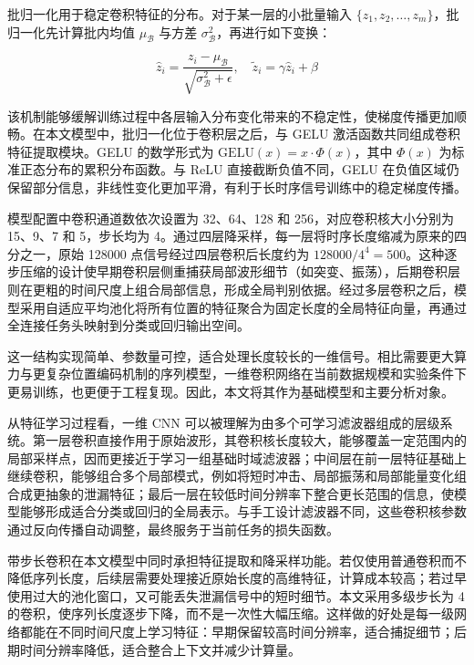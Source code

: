 批归一化用于稳定卷积特征的分布。对于某一层的小批量输入 $\{z_1, z_2, \ldots, z_m\}$，批归一化先计算批内均值 $\mu_{\mathcal{B}}$ 与方差 $\sigma^2_{\mathcal{B}}$，再进行如下变换：

\begin{equation}
\hat{z}_i = \frac{z_i - \mu_{\mathcal{B}}}{\sqrt{\sigma^2_{\mathcal{B}} + \epsilon}}, \quad
\tilde{z}_i = \gamma \hat{z}_i + \beta
\end{equation}

该机制能够缓解训练过程中各层输入分布变化带来的不稳定性，使梯度传播更加顺畅\cite{ioffe2015batch}。在本文模型中，批归一化位于卷积层之后，与 GELU 激活函数共同组成卷积特征提取模块。GELU 的数学形式为 $\text{GELU}(x) = x \cdot \Phi(x)$，其中 $\Phi(x)$ 为标准正态分布的累积分布函数。与 ReLU 直接截断负值不同，GELU 在负值区域仍保留部分信息，非线性变化更加平滑，有利于长时序信号训练中的稳定梯度传播\cite{hendrycks2016gelu}。

模型配置中卷积通道数依次设置为 32、64、128 和 256，对应卷积核大小分别为 15、9、7 和 5，步长均为 4。通过四层降采样，每一层将时序长度缩减为原来的四分之一，原始 128000 点信号经过四层卷积后长度约为 $128000 / 4^4 = 500$。这种逐步压缩的设计使早期卷积层侧重捕获局部波形细节（如突变、振荡），后期卷积层则在更粗的时间尺度上组合局部信息，形成全局判别依据。经过多层卷积之后，模型采用自适应平均池化将所有位置的特征聚合为固定长度的全局特征向量，再通过全连接任务头映射到分类或回归输出空间。

这一结构实现简单、参数量可控，适合处理长度较长的一维信号。相比需要更大算力与更复杂位置编码机制的序列模型，一维卷积网络在当前数据规模和实验条件下更易训练，也更便于工程复现。因此，本文将其作为基础模型和主要分析对象。

从特征学习过程看，一维 CNN 可以被理解为由多个可学习滤波器组成的层级系统。第一层卷积直接作用于原始波形，其卷积核长度较大，能够覆盖一定范围内的局部采样点，因而更接近于学习一组基础时域滤波器；中间层在前一层特征基础上继续卷积，能够组合多个局部模式，例如将短时冲击、局部振荡和局部能量变化组合成更抽象的泄漏特征；最后一层在较低时间分辨率下整合更长范围的信息，使模型能够形成适合分类或回归的全局表示。与手工设计滤波器不同，这些卷积核参数通过反向传播自动调整，最终服务于当前任务的损失函数。

带步长卷积在本文模型中同时承担特征提取和降采样功能。若仅使用普通卷积而不降低序列长度，后续层需要处理接近原始长度的高维特征，计算成本较高；若过早使用过大的池化窗口，又可能丢失泄漏信号中的短时细节。本文采用多级步长为 4 的卷积，使序列长度逐步下降，而不是一次性大幅压缩。这样做的好处是每一级网络都能在不同时间尺度上学习特征：早期保留较高时间分辨率，适合捕捉细节；后期时间分辨率降低，适合整合上下文并减少计算量。

